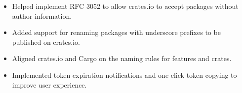 \documentclass{software_engineer_poe_liu}
\newcommand{\en}[1]{#1}
\newcommand{\zh}[1]{}
\begin{document}
\begin{itemize}
      \item \en{Helped implement RFC 3052 to allow crates.io to accept packages without author information.}
            \zh{帮助实现 RFC 3052，让 crates.io 开始接受无作者信息的包。}
      \item \en{Added support for renaming packages with underscore prefixes to be published on crates.io.}
            \zh{支持下划线前缀的重命名包在 crates.io 的发布。}
      \item \en{Aligned crates.io and Cargo on the naming rules for features and crates.}
            \zh{对齐了 crates.io 和 Cargo 对 feature 和 crate 的名称校验规则。}
      \item \en{Implemented token expiration notifications and one-click token copying to improve user experience.}
            \zh{实现了 token 过期提醒和一键复制功能以提升用户体验。}
\end{itemize}

\en{}
\zh{\datedsubsection{\textbf{Rustup(Rust) - 前维护者}}{{\href{https://github.com/rust-lang/rustup/commits?author=0xPoe}{110+ commits}}}}

\en{}
\zh{\datedsubsection{\textbf{Ant Design(TypeScript) - 前维护者}}{{\href{https://github.com/ant-design/ant-design/commits?author=0xPoe}{20+ commits}}}}
\end{document}
